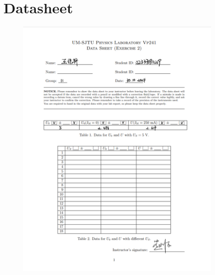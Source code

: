 \documentclass[12pt, a4paper, oneside]{article}
\begin{document}
\section{Datasheet}

\begin{figure}[htbp]
	\centering
	\includegraphics[width=0.9\textwidth]{D1.png}
	\label{fig5}
\end{figure}
\end{document}
